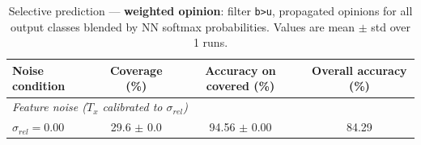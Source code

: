 \begin{table}[ht]
\centering
\caption{Selective prediction — \textbf{weighted opinion}: filter \texttt{b>u}, propagated opinions for all output classes blended by NN softmax probabilities. Values are mean $\pm$ std over 1 runs.}
\label{tab:thresh-wt-0-8}
\begin{tabular}{lccc}
\toprule
Noise condition & Coverage (\%) & Accuracy on covered (\%) & Overall accuracy (\%) \\
\midrule
\multicolumn{4}{l}{\textit{Feature noise ($T_x$ calibrated to $\sigma_{rel}$)}} \\
$\sigma_{rel}=0.00$ & 29.6 $\pm$ 0.0 & 94.56 $\pm$ 0.00 & 84.29 \\
\bottomrule
\end{tabular}
\end{table}